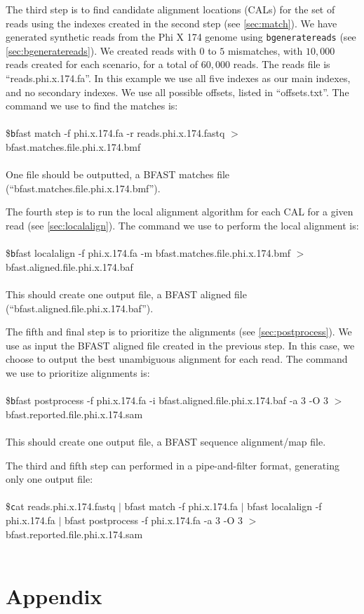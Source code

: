 \documentclass[a4paper,12pt]{book}
\newcommand{\TT}[1]{{\tt #1}} %
\newenvironment{script}{\\\\\footnotesize\$\TT}{\normalsize\\\\}
\newcommand{\BMF}{BFAST matches file} %
\newcommand{\BAF}{BFAST aligned file} %
\newcommand{\BSAMF}{BFAST sequence alignment/map file} %
\begin{document}
The third step is to find candidate alignment locations (CALs) for the set of reads using the indexes created in the second step (see \autoref{sec:match}).
We have generated synthetic reads from the Phi X 174 genome using \TT{bgeneratereads} (see \autoref{sec:bgeneratereads}).
We created reads with $0$ to $5$ mismatches, with $10,000$ reads created for each scenario, for a total of $60,000$ reads.
The reads file is ``reads.phi.x.174.fa''.
In this example we use all five indexes as our main indexes, and no secondary indexes.
We use all possible offsets, listed in ``offsets.txt''.
The command we use to find the matches is:
\begin{script}
	bfast match -f phi.x.174.fa -r reads.phi.x.174.fastq $>$  bfast.matches.file.phi.x.174.bmf
\end{script}
One file should be outputted, a \BMF{} (``bfast.matches.file.phi.x.174.bmf'').

The fourth step is to run the local alignment algorithm for each CAL for a given read (see \autoref{sec:localalign}).
The command we use to perform the local alignment is:
\begin{script}
	bfast localalign -f phi.x.174.fa -m bfast.matches.file.phi.x.174.bmf $>$ bfast.aligned.file.phi.x.174.baf
\end{script}
This should create one output file, a \BAF{} (``bfast.aligned.file.phi.x.174.baf'').

The fifth and final step is to prioritize the alignments (see \autoref{sec:postprocess}).
We use as input the \BAF{} created in the previous step.
In this case, we choose to output the best unambiguous alignment for each read.
The command we use to prioritize alignments is:
\begin{script}
	bfast postprocess -f phi.x.174.fa -i bfast.aligned.file.phi.x.174.baf -a 3 -O 3 $>$ bfast.reported.file.phi.x.174.sam
\end{script}
This should create one output file, a \BSAMF{}.

The third and fifth step can performed in a pipe-and-filter format, generating only one output file:
\begin{script}
	cat reads.phi.x.174.fastq $|$ bfast match -f phi.x.174.fa $|$ bfast localalign -f phi.x.174.fa $|$ bfast postprocess -f phi.x.174.fa -a 3 -O 3 $>$ bfast.reported.file.phi.x.174.sam
\end{script}
\chapter{Appendix}
\end{document}
